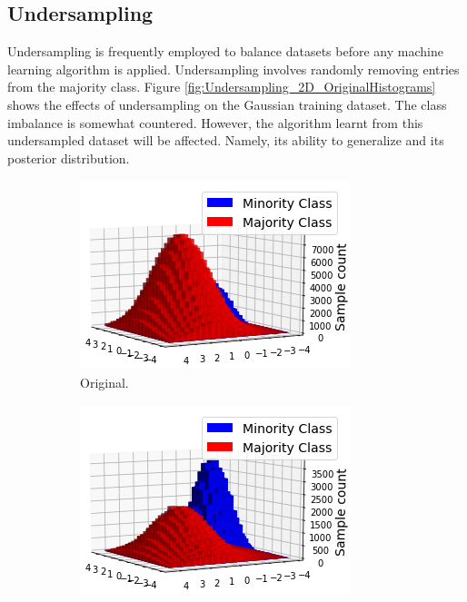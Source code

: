 \documentclass[conference]{IEEEtran}
\begin{document}
	\subsection{Undersampling}
		Undersampling is frequently employed to balance datasets before any machine learning algorithm is applied. Undersampling involves randomly removing entries from the majority class. Figure \ref{fig:Undersampling_2D_OriginalHistograms} shows the effects of undersampling on the Gaussian training dataset. The class imbalance is somewhat countered. However, the algorithm learnt from this undersampled dataset will be affected. Namely, its ability to generalize and its posterior distribution.
			\begin{figure}
			     \centering
			     \begin{subfigure}[b]{0.24\textwidth}
			         \centering
			         \includegraphics[width=\textwidth]{Undersampling_2D_OriginalDataset}
			         \caption{Original.}
			         \label{fig:Undersampling_2D_OriginalDataset}
			     \end{subfigure}
			     \hfill
			     \begin{subfigure}[b]{0.24\textwidth}
			         \centering
			         \includegraphics[width=\textwidth]{Undersampling_2D_UndersampledDataset}

\end{subfigure}
\end{figure}
\end{document}
